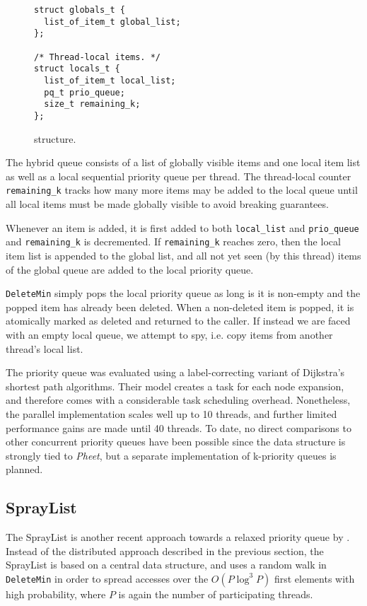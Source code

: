 \documentclass[a4paper,10pt]{article}
\begin{document}
\begin{figure}[h]
\begin{lstlisting}
struct globals_t {
  list_of_item_t global_list;
};

/* Thread-local items. */
struct locals_t {
  list_of_item_t local_list;
  pq_t prio_queue;
  size_t remaining_k;
};
\end{lstlisting}
\caption{\citeauthor{wimmer2013data} structure.}
\label{fig:wimmerq}
\end{figure}

The hybrid queue consists of a list of globally visible items and one local item list as well as a local
sequential priority queue per thread. The thread-local counter \lstinline|remaining_k| tracks how many more
items may be added to the local queue until all local items must be made globally visible to avoid
breaking guarantees.

Whenever an item is added, it is first added to both \lstinline|local_list| and \lstinline|prio_queue|
and \lstinline|remaining_k| is decremented. If \lstinline|remaining_k| reaches zero, then the local
item list is appended to the global list, and all not yet seen (by this thread) items of the global
queue are added to the local priority queue.

\lstinline|DeleteMin| simply pops the local priority queue as long is it is non-empty and the popped
item has already been deleted. When a non-deleted item is popped, it is atomically marked as deleted
and returned to the caller. If instead we are faced with an empty local queue, we attempt to spy,
i.e. copy items from another thread's local list.

The \citeauthor{wimmer2013data} priority queue was evaluated using a label-correcting variant
of Dijkstra's shortest path algorithms. Their model creates a task for each node
expansion, and therefore comes with a considerable task scheduling overhead. Nonetheless,
the parallel implementation scales well up to 10 threads, and further limited performance
gains are made until 40 threads. To date, no direct comparisons to other concurrent
priority queues have been possible since the data structure is strongly tied to \emph{Pheet},
but a separate implementation of k-priority queues is planned.

\subsection{SprayList} \label{sec:spraylist}

The SprayList is another recent approach towards a relaxed priority queue by \citeauthor{alistarhspraylist}
\cite{alistarhspraylist}. Instead of the distributed approach described in the previous section,
the SprayList is based on a central data structure, and uses a random walk in \lstinline|DeleteMin|
in order to spread accesses over the $O(P \log^3 P)$ first elements with high probability, where $P$
is again the number of participating threads.
\end{document}
